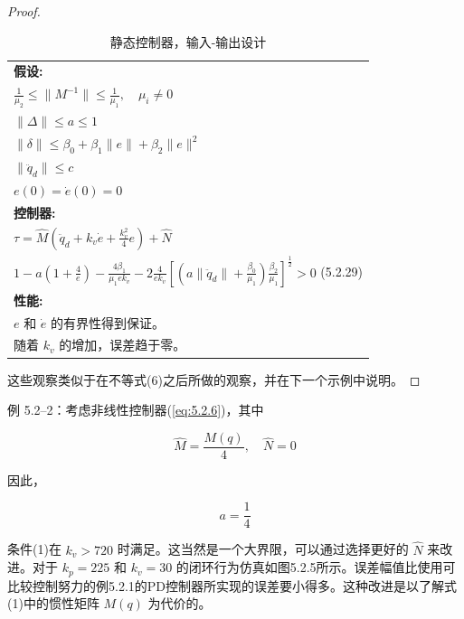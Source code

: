 \documentclass[UTF8,12pt,a4paper]{ctexart}
\begin{document}
\begin{proof}
\begin{table}[htbp]
\centering
\caption{静态控制器，输入-输出设计}
\label{tab:5.2.2}
\begin{tabular}{@{}l@{}}
\toprule
\textbf{假设:} \\
\quad $\displaystyle \frac{1}{\mu_2} \leq \|M^{-1}\| \leq \frac{1}{\mu_1}, \quad \mu_i \neq 0$ \\[1em]
\quad $\|\Delta\| \leq a \leq 1$ \\[0.8em]
\quad $\|\delta\| \leq \beta_0 + \beta_1\|e\| + \beta_2\|e\|^2$ \\[0.8em]
\quad $\|\ddot{q}_d\| \leq c$ \\[0.8em]
\quad $e(0) = \dot{e}(0) = 0$ \\[1em]
\midrule
\textbf{控制器:} \\
\quad $\displaystyle \tau = \hat{M}\left(\ddot{q}_d + k_v\dot{e} + \frac{k_v^2}{4}e\right) + \hat{N}$ \\[1.2em]
\quad $\displaystyle 1 - a\left(1 + \frac{4}{e}\right) - \frac{4\beta_1}{\mu_1 e k_v} - 2\frac{4}{e k_v}\left[\left(a\|\ddot{q}_d\| + \frac{\beta_0}{\mu_1}\right)\frac{\beta_2}{\mu_1}\right]^{\frac{1}{2}} > 0$ \hfill (5.2.29) \\[1em]
\midrule
\textbf{性能:} \\
\quad $e$ 和 $\dot{e}$ 的有界性得到保证。 \\
\quad 随着 $k_v$ 的增加，误差趋于零。 \\
\bottomrule
\end{tabular}
\end{table}

这些观察类似于在不等式(6)之后所做的观察，并在下一个示例中说明。
\end{proof}

\begin{example}
例 5.2--2：考虑非线性控制器(\ref{eq:5.2.6})，其中

\begin{equation*}
\hat{M} = \frac{M(q)}{4}, \quad \hat{N} = 0
\end{equation*}

因此，

\begin{equation*}
a = \frac{1}{4}
\end{equation*}

条件(1)在 $k_v > 720$ 时满足。这当然是一个大界限，可以通过选择更好的 $\hat{N}$ 来改进。对于 $k_p = 225$ 和 $k_v = 30$ 的闭环行为仿真如图5.2.5所示。误差幅值比使用可比较控制努力的例5.2.1的PD控制器所实现的误差要小得多。这种改进是以了解式(1)中的惯性矩阵 $M(q)$ 为代价的。
\end{example}
\end{document}
